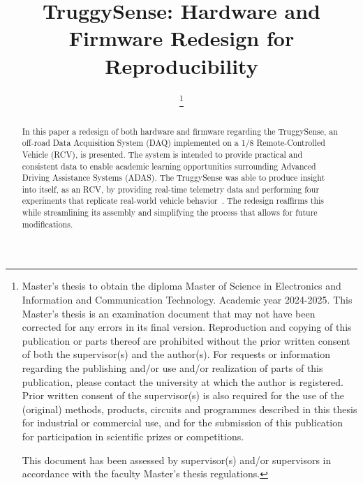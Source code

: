 \documentclass[conference,a4paper]{IEEEtran}
\newcommand{\ParagraphSeperator}{
  \setlength{\parskip}{0em}
  \setlength{\parindent}{10pt}
}
\begin{document}
\title{TruggySense: Hardware and Firmware Redesign for Reproducibility}

\author{
	\thanks{Master's thesis to obtain the diploma 
			Master of Science in Electronics and Information and Communication Technology. Academic year \mbox{2024-2025}.
			This Master's thesis is an examination document that may not have been corrected for any errors in its final version. 
			Reproduction and copying of this publication or parts thereof are prohibited without the prior written consent of 
			both the supervisor(s) and the author(s). For requests or information regarding the publishing and/or use and/or 
			realization of parts of this publication, please contact the university at which the author is registered.
			Prior written consent of the supervisor(s) is also required for the use of the (original) methods, products, 
			circuits and programmes described in this thesis for industrial or commercial use, and for the submission of this 
			publication for participation in scientific prizes or competitions.

			This document has been assessed by supervisor(s) and/or supervisors in accordance with the faculty 
			Master's thesis regulations.}
}

\maketitle

\ParagraphSeperator
\begin{abstract}
In this paper a redesign of both hardware and firmware regarding the TruggySense, an off-road Data Acquisition System (DAQ) implemented on a 1/8 Remote-Controlled Vehicle (RCV), is presented.
The system is intended to provide practical and consistent data to enable academic learning opportunities surrounding Advanced Driving Assistance Systems (ADAS).
The TruggySense was able to produce insight into itself, as an RCV, by providing real-time telemetry data and performing four experiments that replicate real-world vehicle behavior~\cite{Elsermans2025}.
The redesign reaffirms this while streamlining its assembly and simplifying the process that allows for future modifications.
\end{abstract}
\end{document}
